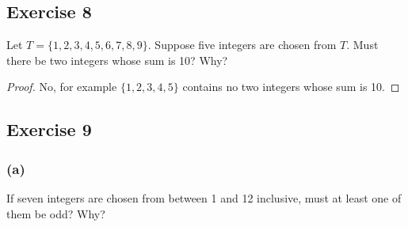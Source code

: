 \documentclass[14pt]{extarticle}
\begin{document}
\subsection{Exercise 8}
Let \(T = \{1, 2, 3, 4, 5, 6, 7, 8, 9\}\). Suppose five integers are chosen from \(T\). Must there be two integers
whose sum is 10? Why?

\begin{proof}
     No, for example \(\{1,2,3,4,5\}\) contains no two integers whose sum is 10.
\end{proof}

\subsection{Exercise 9}
\subsubsection{(a)}
If seven integers are chosen from between 1 and 12 inclusive, must at least one of them be odd? Why?
\end{document}
